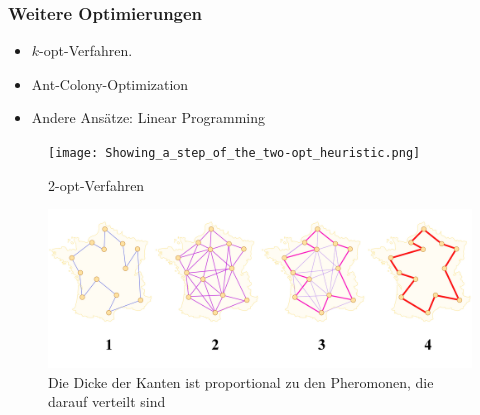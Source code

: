 \begin{frame}
	\frametitle{Weitere Optimierungen}
	 {
		\begin{itemize}
			\item<1->	$k$-opt-Verfahren.
			\item<3-> 	Ant-Colony-Optimization
			\item<5->	Andere Ansätze: Linear Programming
		\end{itemize}
	}

	 {
		\begin{figure}
			\texttt{[image: Showing\_a\_step\_of\_the\_two-opt\_heuristic.png]}
			\caption{2-opt-Verfahren}
		\end{figure}
	}

	 	{
		\begin{figure}
			\includegraphics[scale=0.3]{images/traveling-salesman-problem}
			\caption{Die Dicke der Kanten ist proportional zu den Pheromonen, die darauf verteilt sind}
		\end{figure}
	}
\end{frame}
